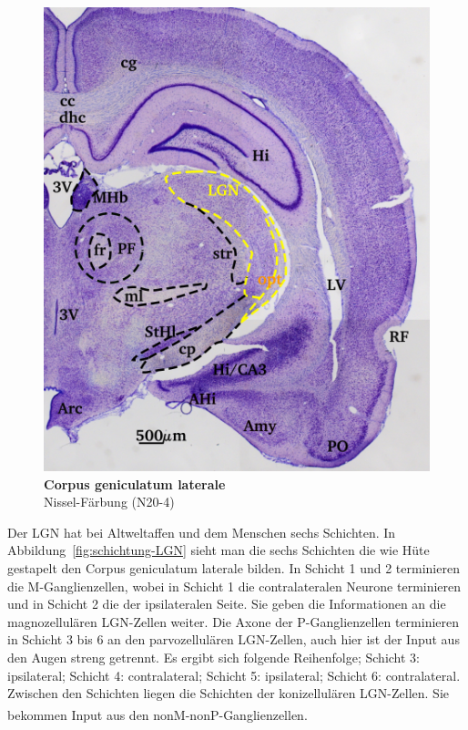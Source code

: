 \documentclass[12pt,a4paper,pdftex]{article}
\begin{document}
\begin{figure}[H]
    \centering
    \includegraphics{pictures/visual/LGN.png}
    \caption[Corpus geniculatum laterale]{\textbf{Corpus geniculatum laterale}\\
    Nissel-Färbung (N20-4)}
    \label{fig:LGN}
\end{figure}

Der LGN hat bei Altweltaffen und dem Menschen sechs Schichten. 
In Abbildung~\ref{fig:schichtung-LGN} sieht man die sechs Schichten die wie Hüte gestapelt den Corpus geniculatum laterale bilden. In Schicht 1 und 2 terminieren die M-Ganglienzellen, wobei in Schicht 1 die contralateralen Neurone terminieren und in Schicht 2 die der ipsilateralen Seite. Sie geben die Informationen an die magnozellulären LGN-Zellen weiter. Die Axone der P-Ganglienzellen terminieren in Schicht 3 bis 6 an den parvozellulären LGN-Zellen, auch hier ist der Input aus den Augen streng getrennt. Es ergibt sich folgende Reihenfolge; Schicht 3: ipsilateral; Schicht 4: contralateral; Schicht 5: ipsilateral; Schicht 6: contralateral.
Zwischen den Schichten liegen die Schichten der konizellulären LGN-Zellen. Sie bekommen Input aus den nonM-nonP-Ganglienzellen. \textsuperscript{\cite[9.7]{heldmaier2003tierphysiologie}}
\end{document}
